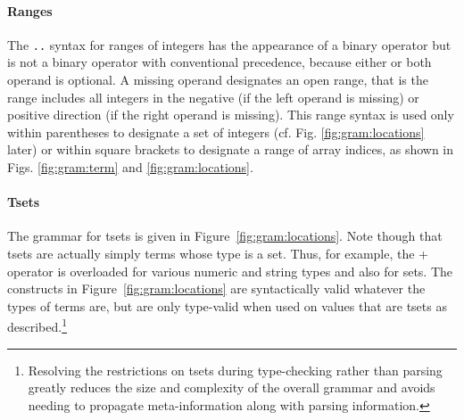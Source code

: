 \paragraph{Ranges}
The \lstinline|..| syntax for ranges of integers has the appearance of a
binary operator but is not a binary operator with conventional precedence,
because either or both operand is optional.  
A missing operand designates an
open range, that is the range includes all integers in the negative (if the left operand is missing) or positive direction (if the right operand is missing).
This range syntax is used only within parentheses to designate a set of 
integers (cf. Fig. \ref{fig:gram:locations} later) or within square brackets to designate a 
range of array indices, as shown in Figs.  \ref{fig:gram:term} and 
\ref{fig:gram:locations}.

\paragraph{Tsets}
The grammar for tsets is given in
Figure~\ref{fig:gram:locations}. 
Note though that tsets are actually simply terms whose type is a set. Thus, for example, the + operator is overloaded for various numeric and string types and also for sets.
The constructs in Figure~\ref{fig:gram:locations} are syntactically valid whatever the types of terms are, but are only type-valid when used on values that are tsets as described.\footnote{Resolving the restrictions on tsets during type-checking rather than parsing greatly reduces the size and complexity of the overall grammar and avoids needing to
propagate meta-information along with parsing information.}

